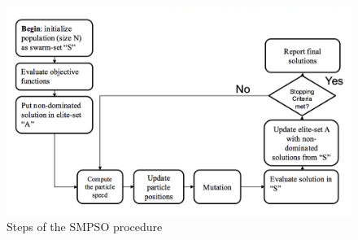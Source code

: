 \documentclass[10pt,journal,compsoc]{IEEEtran}
\begin{document}
\begin{figure}[ht]
\centerline{\includegraphics[width=\columnwidth]{psophaseflowchart.png}}
\caption{Steps of the SMPSO procedure} 
\label{smpsoflow}
\end{figure}
\end{document}
